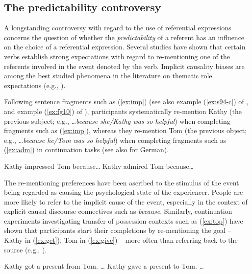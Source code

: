 \documentclass[output=paper,colorlinks,citecolor=brown]{langscibook}
\begin{document}
\subsection{The predictability controversy}

A longstanding controversy with regard to the use of referential expressions concerns the question of whether the \textit{predictability} of a referent has an influence on the choice of a referential expression. Several studies have shown that certain verbs establish strong expectations with regard to re-mentioning one of the referents involved in the event denoted by the verb. Implicit causality biases are among the best studied phenomena in the literature on thematic role expectations (e.g., \citealt{Garvey::Caramazza-74, Au-86, Bott::Solstad-14}).

Following sentence fragments such as (\ref{ex:imp}) (see also example (\ref{ex:s94-c}) of \citealt{Stevenson::al-94}, and example (\ref{ex:fg10}) of \citealt{Fukumura::van_Gompel-10}), participants systematically re-mention Kathy (the previous subject; e.g., \textit{\ldots because she/Kathy was so helpful}) when completing fragments such as (\ref{ex:imp}), whereas they re-mention Tom (the previous object; e.g., \textit{\ldots because he/Tom was so helpful}) when completing fragments such as (\ref{ex:adm}) in continuation tasks (see also \citealt{Holler::Suckow-16, Bittner-19, Portele::Bader-20} for German).

\ea \ea Kathy impressed Tom because\ldots\label{ex:imp}
     \ex Kathy admired Tom because\ldots\label{ex:adm}
\z\z

The re-mentioning preferences have been ascribed to the stimulus of the event being regarded as causing the psychological state of the experiencer. People are more likely to refer to the implicit cause of the event, especially in the context of explicit causal discourse connectives such as \textit{because}.
Similarly, continuation experiments investigating transfer of possession contexts such as (\ref{ex:top}) have shown that participants start their completions by re-mentioning the goal -- Kathy in (\ref{ex:get}), Tom in (\ref{ex:give}) -- more often than referring back to the source (e.g., \citealt{Stevenson::al-94, Arnold-01, Kehler::Rohde-13}).

\ea\label{ex:top} \ea Kathy got a present from Tom. \ldots\label{ex:get}
    \ex Kathy gave a present to Tom. \ldots\label{ex:give}
\z\z
\end{document}
